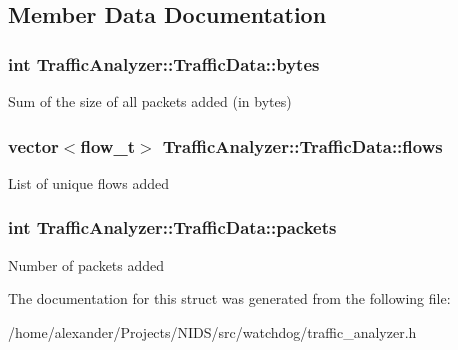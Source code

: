 \subsection{Member Data Documentation}
\hypertarget{structTrafficAnalyzer_1_1TrafficData_a216da5ddb1faa2ee2c900300a532b4df}{
\subsubsection[{bytes}]{\setlength{\rightskip}{0pt plus 5cm}int Traffic\-Analyzer\-::\-Traffic\-Data\-::bytes}}\label{structTrafficAnalyzer_1_1TrafficData_a216da5ddb1faa2ee2c900300a532b4df}
Sum of the size of all packets added (in bytes) \hypertarget{structTrafficAnalyzer_1_1TrafficData_a76f38620516933ff56687ce8747db952}{
\subsubsection[{flows}]{\setlength{\rightskip}{0pt plus 5cm}vector$<$flow\-\_\-t$>$ Traffic\-Analyzer\-::\-Traffic\-Data\-::flows}}\label{structTrafficAnalyzer_1_1TrafficData_a76f38620516933ff56687ce8747db952}
List of unique flows added \hypertarget{structTrafficAnalyzer_1_1TrafficData_ab71ce320ed4920dcb96ed06048c7b71f}{
\subsubsection[{packets}]{\setlength{\rightskip}{0pt plus 5cm}int Traffic\-Analyzer\-::\-Traffic\-Data\-::packets}}\label{structTrafficAnalyzer_1_1TrafficData_ab71ce320ed4920dcb96ed06048c7b71f}
Number of packets added 

The documentation for this struct was generated from the following file\-:\begin{DoxyCompactItemize}
\item 
/home/alexander/\-Projects/\-N\-I\-D\-S/src/watchdog/traffic\-\_\-analyzer.\-h\end{DoxyCompactItemize}
